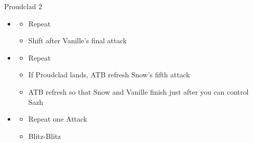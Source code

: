 \begin{battle}[2:01]{Proudclad 2}
\begin{multicols}{2}
\begin{itemize}
\begin{itemize}
				      \item Auto-Chain one spell
				      \item \textit{Oneiric Maelstrom}:
				            \begin{itemize}
					            \item Renew to prevent Sazh from Launching
					            \item Auto-Chain 2 spells
					            \item Cold Blood
				            \end{itemize}
				      \item \textit{Muon Blaster $\rightarrow$ Oneiric Maelstrom}
				            \begin{itemize}
					            \item Renew to prevent Sazh from Launching
					            \item Cold Blood
				            \end{itemize}
				      \item \textit{Muon Blaster $\rightarrow$ Muon Blaster}
				            \begin{itemize}
					            \item Cold Blood to prevent Sazh's interruption
				            \end{itemize}
				      \item ATB refresh after Cold Blood starts to maximize Launches
			      \end{itemize}
			\item \fifth
			      \begin{itemize}
				      \item Repeat
				      \item Shift after Vanille's final attack
			      \end{itemize}
			\item \first
			      \begin{itemize}
				      \item Repeat
				      \item If Proudclad lands, ATB refresh Snow's fifth attack
				      \item ATB refresh so that Snow and Vanille finish just after you can control Sazh
			      \end{itemize}
			\item \second
			      \begin{itemize}
				      \item Repeat one Attack
				      \item Blitz-Blitz

\end{itemize}
\end{itemize}
\end{multicols}
\end{battle}
